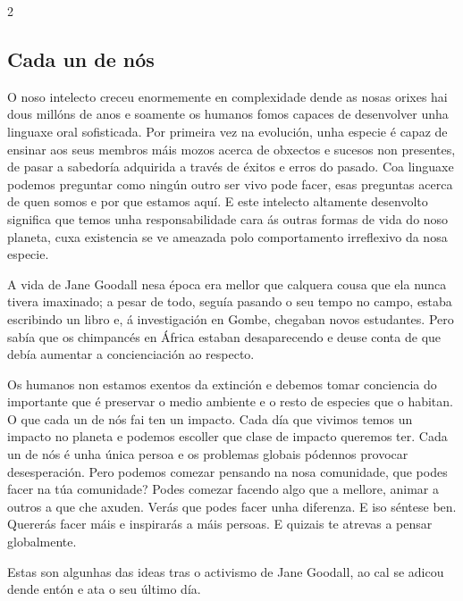 \begin{multicols}{2}
\subsection*{Cada un de nós}

O noso intelecto creceu enormemente en complexidade dende as nosas orixes hai
dous millóns de anos e soamente os humanos fomos capaces de desenvolver unha
linguaxe oral sofisticada. Por primeira vez na evolución, unha especie é capaz
de ensinar aos seus membros máis mozos acerca de obxectos e sucesos non
presentes, de pasar a sabedoría adquirida a través de éxitos e erros do pasado.
Coa linguaxe podemos preguntar como ningún outro ser vivo pode facer, esas
preguntas acerca de quen somos e por que estamos aquí. E este intelecto
altamente desenvolto significa que temos unha responsabilidade cara ás outras
formas de vida do noso planeta, cuxa existencia se ve ameazada polo
comportamento irreflexivo da nosa especie.

A vida de Jane Goodall nesa época era mellor que calquera cousa que ela nunca
tivera imaxinado; a pesar de todo, seguía pasando o seu tempo no campo, estaba
escribindo un libro e, á investigación en Gombe, chegaban novos estudantes.
Pero sabía que os chimpancés en África estaban desaparecendo e deuse conta de
que debía aumentar a concienciación ao respecto.

Os humanos non estamos exentos da extinción e debemos tomar conciencia do
importante que é preservar o medio ambiente e o resto de especies que o
habitan. O que cada un de nós fai ten un impacto. Cada día que vivimos temos un
impacto no planeta e podemos escoller que clase de impacto queremos ter. Cada
un de nós é unha única persoa e os problemas globais pódennos provocar
desesperación. Pero podemos comezar pensando na nosa comunidade, que podes
facer na túa comunidade? Podes comezar facendo algo que a mellore, animar a
outros a que che axuden. Verás que podes facer unha diferenza. E iso séntese
ben. Quererás facer máis e inspirarás a máis persoas. E quizais te atrevas a
pensar globalmente.

Estas son algunhas das ideas tras o activismo de Jane Goodall, ao cal se adicou
dende entón e ata o seu último día.



\end{multicols}
